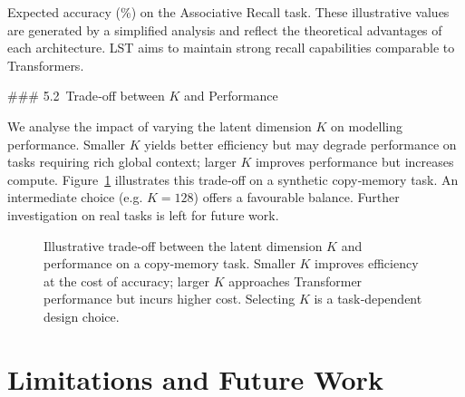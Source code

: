\documentclass[10pt,twocolumn,letterpaper]{article}
\begin{document}
\begin{table}[t]
\centering
\small
{}
\caption{Expected accuracy (\%) on the Associative Recall task.  These illustrative values are generated by a simplified analysis and reflect the theoretical advantages of each architecture.  LST aims to maintain strong recall capabilities comparable to Transformers.}
\label{tab:associative_recall}
\end{table}

### 5.2 Trade‑off between $K$ and Performance

We analyse the impact of varying the latent dimension $K$ on modelling performance.  Smaller $K$ yields better efficiency but may degrade performance on tasks requiring rich global context; larger $K$ improves performance but increases compute.  Figure \ref{fig:k_tradeoff} illustrates this trade‑off on a synthetic copy‑memory task.  An intermediate choice (e.g. $K=128$) offers a favourable balance.  Further investigation on real tasks is left for future work.

\begin{figure}[t]
\centering
{}
\caption{Illustrative trade‑off between the latent dimension $K$ and performance on a copy‑memory task.  Smaller $K$ improves efficiency at the cost of accuracy; larger $K$ approaches Transformer performance but incurs higher cost.  Selecting $K$ is a task‑dependent design choice.}
\label{fig:k_tradeoff}
\end{figure}

\section{Limitations and Future Work}
\end{document}

